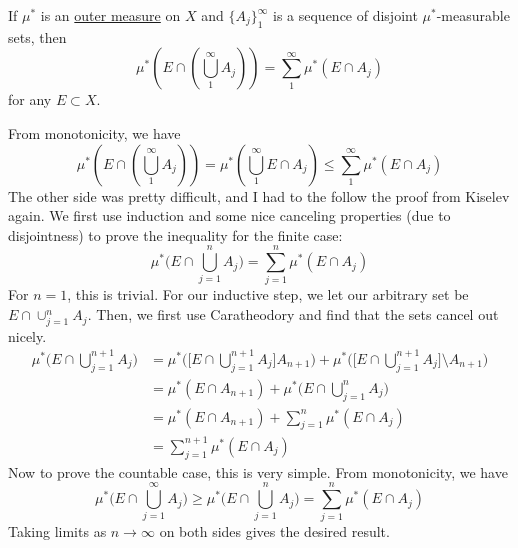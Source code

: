 	\begin{exercise}[Folland 1.17]
		If $\mu^*$ is an \hyperref[def:outer-measure]{outer measure} on $X$ and $\{A_j\}_1^\infty$ is a sequence of disjoint $\mu^*$-measurable sets, then 
		\begin{equation}
			\mu^*\left(E \cap \left(\bigcup_1^\infty A_j\right)\right) = \sum_1^\infty \mu^*(E \cap A_j)
		\end{equation}
		for any $E \subset X$.
	\end{exercise}
	\begin{solution}
		From monotonicity, we have 
		\begin{equation}
			\mu^\ast \left(E \cap \left(\bigcup_1^\infty A_j\right)\right) = \mu^\ast \left(\bigcup_1^\infty E \cap A_j \right) \leq \sum_1^\infty \mu^*(E \cap A_j)
		\end{equation}
		The other side was pretty difficult, and I had to the follow the proof from Kiselev again. We first use induction and some nice canceling properties (due to disjointness) to prove the inequality for the finite case: 
		\begin{equation}
			\mu^\ast \bigg( E \cap \bigcup_{j=1}^n A_j \bigg) = \sum_{j=1}^n \mu^\ast (E \cap A_j) 
		\end{equation}
		For $n = 1$, this is trivial. For our inductive step, we let our arbitrary set be $E \cap \cup_{j=1}^n A_j$. Then, we first use Caratheodory and find that the sets cancel out nicely. 
		\begin{align}
			\mu^\ast \bigg( E \cap \bigcup_{j=1}^{n+1} A_j \bigg) 
				& = \mu^\ast \bigg( \bigg[ E \cap \bigcup_{j=1}^{n+1} A_j \bigg] A_{n+1} \bigg) + \mu^\ast \bigg( \bigg[ E \cap \bigcup_{j=1}^{n+1} A_j \bigg] \setminus A_{n+1} \bigg) \\ 
				& = \mu^\ast (E \cap A_{n+1}) + \mu^\ast \bigg( E \cap \bigcup_{j=1}^n A_j \bigg) \\ 
				& = \mu^\ast (E \cap A_{n+1}) + \sum_{j=1}^n \mu^\ast (E \cap A_j) \\ 
				& = \sum_{j=1}^{n+1} \mu^\ast (E \cap A_j) 
		\end{align}
		Now to prove the countable case, this is very simple. From monotonicity, we have 
		\begin{equation}
			\mu^\ast \bigg( E \cap \bigcup_{j=1}^\infty A_j \bigg) \geq \mu^\ast \bigg( E \cap \bigcup_{j=1}^n A_j \bigg) = \sum_{j=1}^n \mu^\ast (E \cap A_j)
		\end{equation}
		Taking limits as $n \to \infty$ on both sides gives the desired result. 
	\end{solution}


